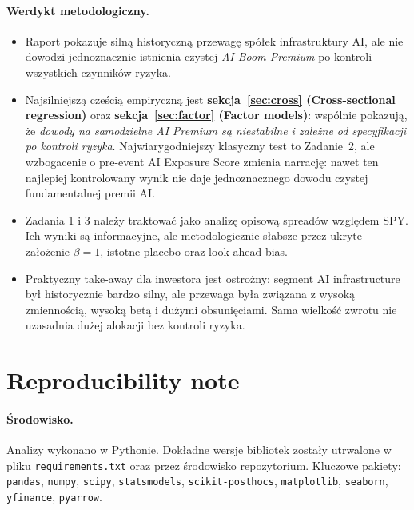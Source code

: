 \documentclass[11pt,a4paper]{article}
\begin{document}
\paragraph{Werdykt metodologiczny.}
\begin{itemize}
  \item Raport pokazuje silną historyczną przewagę spółek infrastruktury AI,
        ale nie dowodzi jednoznacznie istnienia czystej \emph{AI Boom Premium}
        po kontroli wszystkich czynników ryzyka.
  \item Najsilniejszą cześcią empiryczną jest \textbf{sekcja~\ref{sec:cross}
        (Cross-sectional regression)} oraz \textbf{sekcja~\ref{sec:factor}
        (Factor models)}: wspólnie pokazują, że \emph{dowody na samodzielne
        AI Premium są niestabilne i zależne od specyfikacji po kontroli ryzyka}.
        Najwiarygodniejszy klasyczny test to Zadanie~2, ale wzbogacenie
        o pre-event AI Exposure Score zmienia narrację: nawet ten najlepiej
        kontrolowany wynik nie daje jednoznacznego dowodu czystej fundamentalnej
        premii AI.
  \item Zadania 1 i 3 należy traktować jako analizę opisową spreadów względem
        SPY. Ich wyniki są informacyjne, ale metodologicznie słabsze przez
        ukryte założenie $\beta=1$, istotne placebo oraz look-ahead bias.
  \item Praktyczny take-away dla inwestora jest ostrożny: segment AI
        infrastructure był historycznie bardzo silny, ale przewaga była związana
        z wysoką zmiennością, wysoką betą i dużymi obsunięciami. Sama wielkość
        zwrotu nie uzasadnia dużej alokacji bez kontroli ryzyka.
\end{itemize}

\section{Reproducibility note}
\label{sec:repro}

\paragraph{Środowisko.} Analizy wykonano w Pythonie. Dokładne wersje bibliotek
zostały utrwalone w pliku \texttt{requirements.txt} oraz przez środowisko
repozytorium. Kluczowe pakiety:
\texttt{pandas}, \texttt{numpy}, \texttt{scipy}, \texttt{statsmodels},
\texttt{scikit-posthocs}, \texttt{matplotlib}, \texttt{seaborn},
\texttt{yfinance}, \texttt{pyarrow}.
\end{document}
